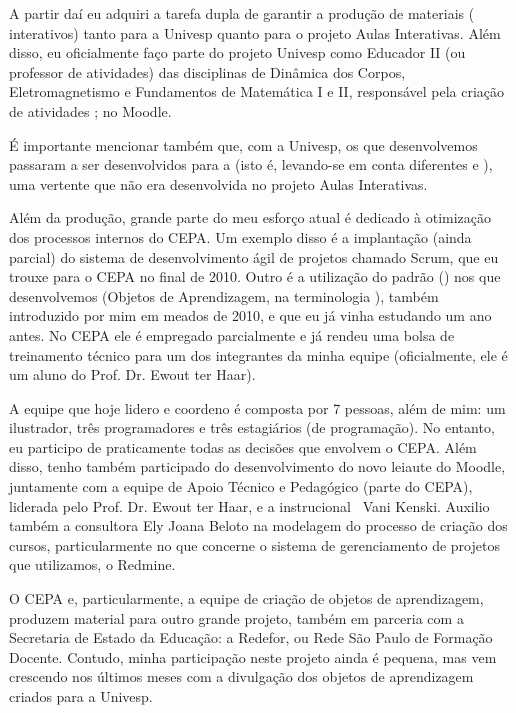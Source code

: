A partir daí eu adquiri a tarefa dupla de garantir a produção de materiais ( interativos) tanto para a Univesp quanto para o projeto Aulas Interativas. Além disso, eu oficialmente faço parte do projeto Univesp como Educador II (ou professor de atividades) das disciplinas de Dinâmica dos Corpos, Eletromagnetismo e Fundamentos de Matemática I e II, responsável pela criação de atividades ; no Moodle.

É importante mencionar também que, com a Univesp, os  que desenvolvemos passaram a ser desenvolvidos para a  (isto é, levando-se em conta diferentes  e ), uma vertente que não era desenvolvida no projeto Aulas Interativas.

Além da produção, grande parte do meu esforço atual é dedicado à otimização dos processos internos do CEPA. Um exemplo disso é a implantação (ainda parcial) do sistema de desenvolvimento ágil de projetos chamado Scrum, que eu trouxe para o CEPA no final de 2010. Outro é a utilização do padrão  () nos  que desenvolvemos (Objetos de Aprendizagem, na terminologia ), também introduzido por mim em meados de 2010, e que eu já vinha estudando um ano antes. No CEPA ele é empregado parcialmente e já rendeu uma bolsa de treinamento técnico para um dos integrantes da minha equipe (oficialmente, ele é um aluno do Prof. Dr. Ewout ter Haar).
 
A equipe que hoje lidero e coordeno é composta por 7 pessoas, além de mim: um ilustrador, três programadores e três estagiários (de programação). No entanto, eu participo de praticamente todas as decisões que envolvem o CEPA. Além disso, tenho também participado do desenvolvimento do novo leiaute do Moodle, juntamente com a equipe de Apoio Técnico e Pedagógico (parte do CEPA), liderada pelo Prof. Dr. Ewout ter Haar, e a  instrucional \profa\ Vani Kenski. Auxilio também a consultora Ely Joana Beloto na modelagem do processo de criação dos cursos, particularmente no que concerne o sistema de gerenciamento de projetos que utilizamos, o Redmine.

O CEPA e, particularmente, a equipe de criação de objetos de aprendizagem, produzem material para outro grande projeto, também em parceria com a Secretaria de Estado da Educação: a Redefor, ou Rede São Paulo de Formação Docente. Contudo, minha participação neste projeto ainda é pequena, mas vem crescendo nos últimos meses com a divulgação dos objetos de aprendizagem criados para a Univesp.

